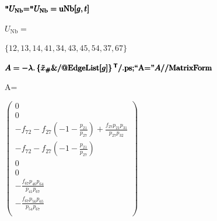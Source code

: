 \documentclass{article}
\newcommand{\unicode}[1]{{}}
\begin{document}
\begin{doublespace}
\noindent\(\pmb{\texttt{"}U_{\text{Nb}}\text{=$\texttt{"}$}}\\
\pmb{U_{\text{Nb}}=\text{uNb}[g,t]}\)
\end{doublespace}

\begin{doublespace}
\noindent\(U_{\text{Nb}}=\)
\end{doublespace}

\begin{doublespace}
\noindent\(\{1\unicode{f3d5}2,1\unicode{f3d5}3,1\unicode{f3d5}4,4\unicode{f3d5}1,3\unicode{f3d5}4,4\unicode{f3d5}3,4\unicode{f3d5}5,5\unicode{f3d5}4,3\unicode{f3d5}7,6\unicode{f3d5}7\}\)
\end{doublespace}

\begin{doublespace}
\noindent\(\pmb{A=-\lambda .\left\{\tilde{x}_{\#}\&\text{/@}\text{EdgeList}[g]\right\}{}^{\mathsf{T}}\text{/.}\text{ps};}\\
\pmb{\text{{``}A={''}}}\\
\pmb{A\text{//}\text{MatrixForm}}\)
\end{doublespace}

\begin{doublespace}
\noindent\(\text{A=}\)
\end{doublespace}

\begin{doublespace}
\noindent\(\left(
\begin{array}{c}
 0 \\
 0 \\
 -f_{7\unicode{f3d5}2}-f_{2\unicode{f3d5}7} \left(-1-\frac{p_{2\unicode{f3d5}1}}{p_{2\unicode{f3d5}7}}\right)+\frac{f_{2\unicode{f3d5}7} p_{2\unicode{f3d5}1}
p_{3\unicode{f3d5}1}}{p_{2\unicode{f3d5}7} p_{3\unicode{f3d5}2}} \\
 -f_{7\unicode{f3d5}2}-f_{2\unicode{f3d5}7} \left(-1-\frac{p_{2\unicode{f3d5}1}}{p_{2\unicode{f3d5}7}}\right) \\
 0 \\
 0 \\
 -\frac{f_{6\unicode{f3d5}7} p_{4\unicode{f3d5}6} p_{6\unicode{f3d5}4}}{p_{4\unicode{f3d5}1} p_{6\unicode{f3d5}7}} \\
 -\frac{f_{6\unicode{f3d5}7} p_{5\unicode{f3d5}6} p_{6\unicode{f3d5}5}}{p_{5\unicode{f3d5}4} p_{6\unicode{f3d5}7}} \\
\end{array}
\right)\)
\end{doublespace}
\end{document}
